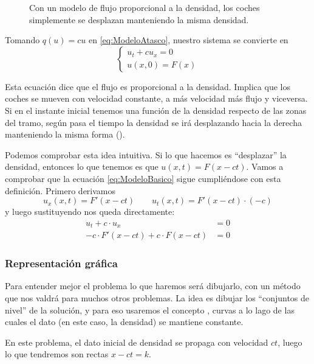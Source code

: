 		\begin{figure}[hbtp]
		\centering
		\caption{Con un modelo de flujo proporcional a la densidad, los coches simplemente se desplazan manteniendo la misma densidad.}
		\label{fig:CochesModeloLineal}
		\end{figure}

		Tomando $q(u) = cu$ en \eqref{eq:ModeloAtasco}, nuestro sistema se convierte en
		\begin{equation}
		\left\{
		\begin{array}{l}
		u_t + cu_x = 0 \\
		u(x,0) = F(x)
		\end{array}
		\right. \label{eq:ModeloBasico}
		\end{equation}

		Esta ecuación dice que el flujo es proporcional a la densidad. Implica que los coches se mueven con velocidad constante, a más velocidad más flujo y viceversa. Si en el instante inicial tenemos una función de la densidad respecto de las zonas del tramo, según pasa el tiempo la densidad se irá desplazando hacia la derecha manteniendo la misma forma ().

		Podemos comprobar esta idea intuitiva. Si lo que hacemos es ``desplazar'' la densidad, entonces lo que tenemos es que $u(x,t) = F(x-ct)$. Vamos a comprobar que la ecuación \eqref{eq:ModeloBasico} sigue cumpliéndose con esta definición. Primero derivamos \[ u_x(x,t) = F'(x-ct) \qquad u_t(x,t) = F'(x-ct) · (-c) \] y luego sustituyendo nos queda directamente: \begin{align*}
			u_t + c·u_x &= 0 \\
			-c·F'(x-ct) + c·F(x-ct) &= 0
		\end{align*}

		\subsubsection{Representación gráfica}

			Para entender mejor el problema lo que haremos será dibujarlo, con un método que nos valdrá para muchos otros problemas. La idea es dibujar los ``conjuntos de nivel'' de la solución, y para eso usaremos el concepto , curvas a lo lago de las cuales el dato (en este caso, la densidad) se mantiene constante.

			En este problema, el dato inicial de densidad se propaga con velocidad $ct$, luego lo que tendremos son rectas $x - ct = k$.

